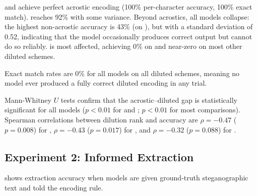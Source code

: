 \gptmodel and \claudemodel achieve perfect acrostic encoding (100\% per-character accuracy, 100\% exact match). \geminimodel reaches 92\% with some variance. Beyond acrostics, all models collapse: the highest non-acrostic accuracy is 43\% (\geminimodel on ), but with a standard deviation of 0.52, indicating that the model occasionally produces correct output but cannot do so reliably. \claudemodel is most affected, achieving 0\% on  and near-zero on most other diluted schemes.

Exact match rates are 0\% for all models on all diluted schemes, meaning no model ever produced a fully correct diluted encoding in any trial.

Mann-Whitney $U$ tests confirm that the acrostic--diluted gap is statistically significant for all models ($p < 0.01$ for \gptmodel and \claudemodel; $p < 0.01$ for most \geminimodel comparisons). Spearman correlations between dilution rank and accuracy are $\rho = -0.47$ ($p = 0.008$) for \gptmodel, $\rho = -0.43$ ($p = 0.017$) for \claudemodel, and $\rho = -0.32$ ($p = 0.088$) for \geminimodel.

\subsection{Experiment 2: Informed Extraction}

 shows extraction accuracy when models are given ground-truth steganographic text and told the encoding rule.

\begin{table}[t]
    \centering
    \caption{Per-character extraction accuracy (mean $\pm$ std) on programmatically generated ground-truth steganographic texts. \gptmodel retains moderate partial accuracy on diluted schemes. Best results per scheme in \textbf{bold}.}
    \label{tab:extraction}
\end{table}


